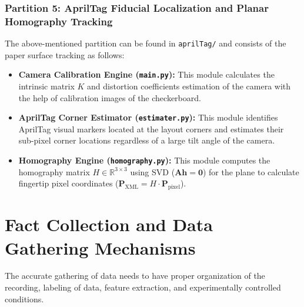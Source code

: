 \subsubsection{Partition 5: AprilTag Fiducial Localization and Planar Homography Tracking}
The above-mentioned partition can be found in \texttt{aprilTag/} and consists of the paper surface tracking as follows:
\begin{itemize}
    \item \textbf{Camera Calibration Engine (\texttt{main.py}):} This module calculates the intrinsic matrix $K$ and distortion coefficients estimation of the camera with the help of calibration images of the checkerboard.
    \item \textbf{AprilTag Corner Estimator (\texttt{estimater.py}):} This module identifies AprilTag visual markers located at the layout corners and estimates their sub-pixel corner locations regardless of a large tilt angle of the camera.
    \item \textbf{Homography Engine (\texttt{homography.py}):} This module computes the homography matrix $H \in \mathbb{R}^{3 \times 3}$ using SVD ($\mathbf{A} \mathbf{h} = \mathbf{0}$) for the plane to calculate fingertip pixel coordinates ($\mathbf{P}_{\text{XML}} = H \cdot \mathbf{P}_{\text{pixel}}$).
\end{itemize}

\section{Fact Collection and Data Gathering Mechanisms}
\label{sec:meth_fact_collection}
The accurate gathering of data needs to have proper organization of the recording, labeling of data, feature extraction, and experimentally controlled conditions.


